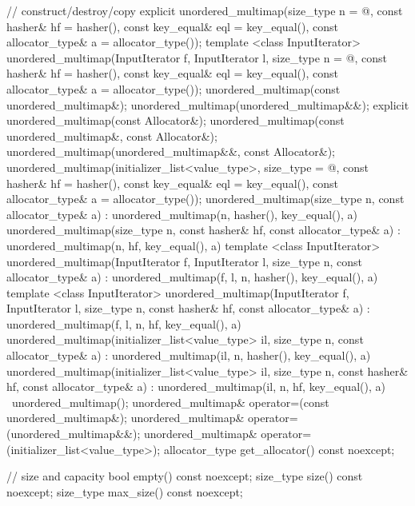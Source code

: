 \begin{codeblock}
{{    // construct/destroy/copy
    explicit unordered_multimap(size_type n = @\seebelow@,
                                const hasher& hf = hasher(),
                                const key_equal& eql = key_equal(),
                                const allocator_type& a = allocator_type());
    template <class InputIterator>
      unordered_multimap(InputIterator f, InputIterator l,
                         size_type n = @\seebelow@,
                         const hasher& hf = hasher(),
                         const key_equal& eql = key_equal(),
                         const allocator_type& a = allocator_type());
    unordered_multimap(const unordered_multimap&);
    unordered_multimap(unordered_multimap&&);
    explicit unordered_multimap(const Allocator&);
    unordered_multimap(const unordered_multimap&, const Allocator&);
    unordered_multimap(unordered_multimap&&, const Allocator&);
    unordered_multimap(initializer_list<value_type>,
      size_type = @\seebelow@,
      const hasher& hf = hasher(),
      const key_equal& eql = key_equal(),
      const allocator_type& a = allocator_type());
    unordered_multimap(size_type n, const allocator_type& a)
      : unordered_multimap(n, hasher(), key_equal(), a) { }
    unordered_multimap(size_type n, const hasher& hf, const allocator_type& a)
      : unordered_multimap(n, hf, key_equal(), a) { }
    template <class InputIterator>
      unordered_multimap(InputIterator f, InputIterator l, size_type n, const allocator_type& a)
      : unordered_multimap(f, l, n, hasher(), key_equal(), a) { }
    template <class InputIterator>
      unordered_multimap(InputIterator f, InputIterator l, size_type n, const hasher& hf, 
      const allocator_type& a)
      : unordered_multimap(f, l, n, hf, key_equal(), a) { }
    unordered_multimap(initializer_list<value_type> il, size_type n, const allocator_type& a)
      : unordered_multimap(il, n, hasher(), key_equal(), a) { }
    unordered_multimap(initializer_list<value_type> il, size_type n, const hasher& hf, 
    const allocator_type& a)
      : unordered_multimap(il, n, hf, key_equal(), a) { }
    ~unordered_multimap();
    unordered_multimap& operator=(const unordered_multimap&);
    unordered_multimap& operator=(unordered_multimap&&);
    unordered_multimap& operator=(initializer_list<value_type>);
    allocator_type get_allocator() const noexcept;

    // size and capacity
    bool empty() const noexcept;
    size_type size() const noexcept;
    size_type max_size() const noexcept;

}}
\end{codeblock}
